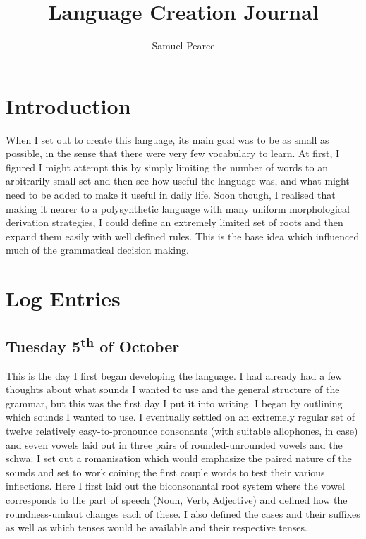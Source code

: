 \documentclass[a4paper,10pt]{article}
\title{Language Creation Journal}
\author{Samuel Pearce}
\begin{document}
\maketitle

\tableofcontents

\pagebreak

\section{Introduction}
When I set out to create this language, its main goal was to be as small as possible,
in the sense that there were very few vocabulary to learn. At first, I figured I might
attempt this by simply limiting the number of words to an arbitrarily small set and then
see how useful the language was, and what might need to be added to make it useful in
daily life. Soon though, I realised that making it nearer to a polysynthetic language
with many uniform morphological derivation strategies, I could define an extremely limited
set of roots and then expand them easily with well defined rules. This is the base idea
which influenced much of the grammatical decision making.

\section{Log Entries}

\subsection{Tuesday 5\textsuperscript{th} of October}
This is the day I first began developing the language. I had already had a few thoughts
about what sounds I wanted to use and the general structure of the grammar, but this was
the first day I put it into writing. I began by outlining which sounds I wanted to use.
I eventually settled on an extremely regular set of twelve relatively easy-to-pronounce
consonants (with suitable allophones, in case) and seven vowels laid out in three pairs
of rounded-unrounded vowels and the schwa. I set out a romanisation which would emphasize
the paired nature of the sounds and set to work coining the first couple words to test
their various inflections. Here I first laid out the biconsonantal root system where the
vowel corresponds to the part of speech (Noun, Verb, Adjective) and defined how the
roundness-umlaut changes each of these. I also defined the cases and their suffixes as well
as which tenses would be available and their respective tenses.
\end{document}
